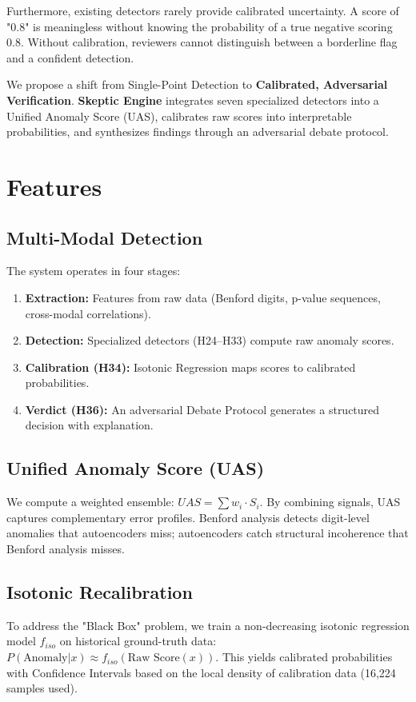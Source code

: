 \documentclass{bioinfo}
\begin{document}
Furthermore, existing detectors rarely provide calibrated uncertainty. A score of "0.8" is meaningless without knowing the probability of a true negative scoring 0.8. Without calibration, reviewers cannot distinguish between a borderline flag and a confident detection.

We propose a shift from Single-Point Detection to \textbf{Calibrated, Adversarial Verification}. \textbf{Skeptic Engine} integrates seven specialized detectors into a Unified Anomaly Score (UAS), calibrates raw scores into interpretable probabilities, and synthesizes findings through an adversarial debate protocol.

\section{Features}
\subsection{Multi-Modal Detection}
The system operates in four stages:
\begin{enumerate}
    \item \textbf{Extraction:} Features from raw data (Benford digits, p-value sequences, cross-modal correlations).
    \item \textbf{Detection:} Specialized detectors (H24--H33) compute raw anomaly scores.
    \item \textbf{Calibration (H34):} Isotonic Regression maps scores to calibrated probabilities.
    \item \textbf{Verdict (H36):} An adversarial Debate Protocol generates a structured decision with explanation.
\end{enumerate}

\subsection{Unified Anomaly Score (UAS)}
We compute a weighted ensemble: $UAS = \sum w_i \cdot S_i$. By combining signals, UAS captures complementary error profiles. Benford analysis detects digit-level anomalies that autoencoders miss; autoencoders catch structural incoherence that Benford analysis misses.

\subsection{Isotonic Recalibration}
To address the "Black Box" problem, we train a non-decreasing isotonic regression model $f_{iso}$ on historical ground-truth data: $P(\text{Anomaly} | x) \approx f_{iso}(\text{Raw Score}(x))$. This yields calibrated probabilities with Confidence Intervals based on the local density of calibration data (16,224 samples used).
\end{document}
